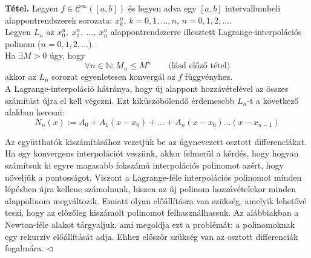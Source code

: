 \documentclass[tikz,12pt,margin=0px]{article}
\begin{document}
	\noindent \textbf{Tétel.} Legyen $f \in \mathcal{C}^{\infty}([a,b])$ és legyen adva egy $[a,b]$ intervallumbeli
	alappontrendszerek sorozata: $x_{k}^{n}$, $k=0,1,\ldots,n$, $n=0,1,2,\ldots$. \\

    \noindent Legyen $L_{n}$ az $x_{0}^{n},\ x_{1}^{n},\ \ldots,\ x_{n}^{n}$ alappontrendszerre illesztett Lagrange-interpolációs polinom ($n=0,1,2,\ldots$).\\

    \noindent Ha $\exists M > 0$ úgy, hogy
    \[
	   \forall n \in \mathbb{N} : M_{n} \leq M^{n} \qquad \text{(lásd előző tétel)}
    \]
    akkor az $L_{n}$ sorozat egyenletesen konvergál az $f$ függvényhez.\\

	

    \noindent A Lagrange-interpoláció hátránya, hogy új alappont hozzávételével az összes számítást újra el kell végezni. Ezt kiküszöbölendő érdemesebb $L_n$-t a következő alakban keresni:
    \[
        N_{n}(x) := A_{0} + A_{1}(x-x_0) + \ldots + A_{n}(x-x_0)\ldots(x-x_{n-1})
    \]

    \noindent Az együtthatók kiszámításához vezetjük be az úgynevezett osztott differenciákat.\\

    {\footnotesize \noindent {\color{blue} \faLightbulbO\ $\triangleright$ } }
    {\footnotesize
    \noindent Ha egy konvergens interpolációt veszünk, akkor felmerül a kérdés, hogy hogyan számítsuk ki egyre magasabb fokszámú interpolációs polinomot azért, hogy növeljük a pontosságot. Viszont a Lagrange-féle interpolációs polinomot minden lépésben újra kellene számolnunk, hiszen az új polinom hozzávételekor minden alappolinom megváltozik. Emiatt olyan előállításra van szükség, amelyik lehetővé teszi, hogy az előzőleg kiszámolt polinomot felhasználhassuk. Az alábbiakban a Newton-féle alakot tárgyaljuk, ami megoldja ezt a problémát: a polinomoknak egy rekurzív előállítását adja. Ehhez először szükség van az osztott differenciák fogalmára.
    $\triangleleft$ \faLightbulbO}\\
\end{document}
